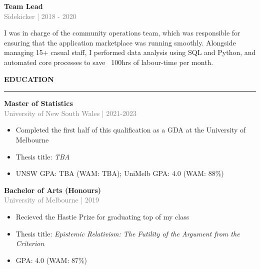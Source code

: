 \documentclass[10pt]{article}
\begin{document}
\vspace{0.5cm}
{\bf Team Lead} \\
\textcolor{gray}{Sidekicker | 2018 - 2020} \\[3pt]
\begin{small}
 I was in charge of the community operations team,  which was responsible for ensuring that the application marketplace was running smoothly. 
 Alongside managing 15+ casual staff, I performed data analysis using SQL and Python, and automated core processes to save ~100hrs of labour-time per month.
\end{small}


\vspace{1cm}
\begin{large}
{\bf EDUCATION} \\
\textcolor{gray}{\rule{2cm}{2mm}}
\end{large}
\vspace{5pt}

{\bf Master of Statistics} \\
\textcolor{gray}{University of New South Wales | 2021-2023}
\begin{small}
\begin{itemize}
  \item Completed the first half of this qualification as a GDA at the University of Melbourne
  \item Thesis title: \textit{TBA}
  \item UNSW GPA: TBA (WAM: TBA); UniMelb GPA: 4.0 (WAM: 88\%)
\end{itemize}
\end{small}

\vspace{0.5cm}
{\bf Bachelor of Arts (Honours)} \\
\textcolor{gray}{University of Melbourne | 2019}
\begin{small}
\begin{itemize}
  \item Recieved the Hastie Prize for graduating top of my class
  \item Thesis title: \textit{Epistemic Relativism: The Futility of the Argument from the Criterion}
  \item GPA: 4.0 (WAM: 87\%)
\end{itemize}
\end{small}
\end{document}
